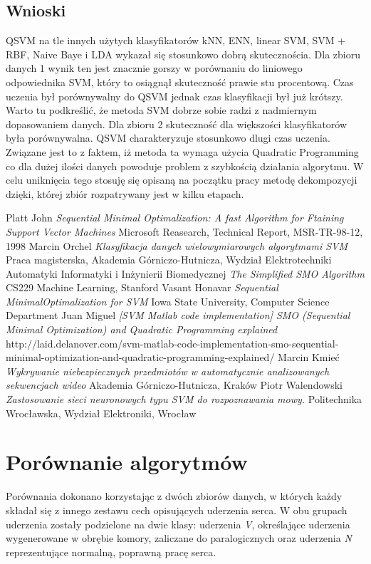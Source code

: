 \documentclass[[10pt,a4paper]{article}
\begin{document}
\begin{enumerate}
 
 \subsection{Wnioski}
 QSVM na tle innych użytych klasyfikatorów kNN, ENN, linear SVM, SVM + RBF, Naive Baye i LDA wykazał się stosunkowo dobrą skutecznościa. Dla zbioru danych 1 wynik ten jest znacznie gorszy w porównaniu do liniowego odpowiednika SVM, który to osiągnął skuteczność prawie stu procentową. Czas uczenia był porównywalny do QSVM jednak czas klasyfikacji był już krótszy. Warto tu podkreślić, że metoda SVM dobrze sobie radzi z nadmiernym dopasowaniem danych. Dla zbioru 2 skuteczność dla większości klasyfikatorów była porównywalna. 
 \newline QSVM charakteryzuje stosunkowo dlugi czas uczenia. Związane jest to z faktem, iż metoda ta wymaga użycia Quadratic Programming co dla dużej ilości danych powoduje problem z szybkością działania algorytmu. W celu uniknięcia tego stosuję się opisaną na początku pracy metodę dekompozycji dzięki, której  zbiór rozpatrywany jest w kilku etapach. 
\begin{thebibliography}{10}
	
	Platt John
	\textit{Sequential Minimal Optimalization: A fast Algorithm for Ftaining Support Vector Machines} 
	Microsoft Reasearch, Technical Report, MSR-TR-98-12, 1998
	Marcin Orchel
	\textit{Klasyfikacja danych wielowymiarowych algorytmami SVM} 
	Praca magisterska, Akademia Górniczo-Hutnicza, Wydział Elektrotechniki Automatyki Informatyki i Inżynierii Biomedycznej
	\textit{The Simplified SMO Algorithm} 
	 CS229 Machine Learning, Stanford
	Vasant Honavar 
	\textit{Sequential MinimalOptimalization for SVM} 
	Iowa State University, Computer Science Department 
	Juan Miguel 
	\textit{[SVM Matlab code implementation] SMO (Sequential Minimal Optimization) and Quadratic Programming explained} 
	http://laid.delanover.com/svm-matlab-code-implementation-smo-sequential-minimal-optimization-and-quadratic-programming-explained/
	Marcin Kmieć
	\textit{Wykrywanie niebezpiecznych przedmiotów w automatycznie
analizowanych sekwencjach wideo} 
	  Akademia Górniczo-Hutnicza, Kraków
	  Piotr Walendowski
	\textit{Zastosowanie sieci neuronowych typu SVM do
rozpoznawania mowy.} 
	  Politechnika Wrocławska, Wydział Elektroniki, Wrocław
\end{thebibliography}
\end{enumerate}
\newpage
\section{Porównanie algorytmów}
Porównania dokonano korzystając z dwóch zbiorów danych, w których każdy składał się z innego zestawu cech opisujących uderzenia serca. W obu grupach uderzenia zostały podzielone na dwie klasy: uderzenia \textit{V}, określające uderzenia wygenerowane w obrębie komory, zaliczane do paralogicznych oraz uderzenia \textit{N} reprezentujące normalną, poprawną pracę serca. 
\end{document}
